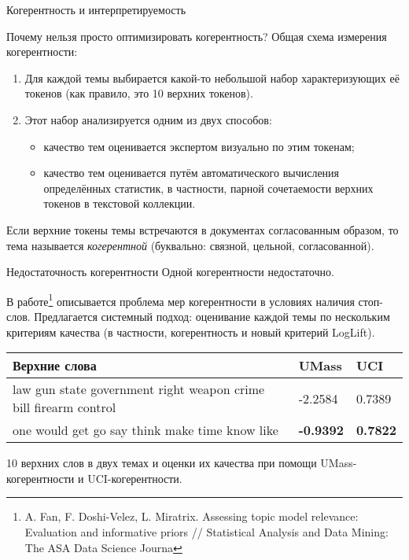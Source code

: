 


\begin{frame}{Когерентность и интерпретируемость}

Почему нельзя просто оптимизировать когерентность? Общая схема измерения когерентности:

\begin{enumerate}
    \item Для каждой темы выбирается какой-то небольшой набор характеризующих её токенов (как правило, это 10 верхних токенов).
    \item{Этот набор анализируется одним из двух способов:
    \begin{itemize}
        \item качество тем оценивается экспертом визуально по этим токенам;
        \item качество тем оценивается путём автоматического вычисления определённых статистик, в частности, парной сочетаемости верхних токенов в текстовой коллекции.
    \end{itemize}
    }
\end{enumerate}

Если верхние токены темы встречаются в документах согласованным образом,  то тема называется \textit{когерентной} (буквально: связной, цельной, согласованной).
\end{frame}

\begin{frame}{Недостаточность когерентности}
Одной когерентности недостаточно.

В работе\footnote{A. Fan, F. Doshi-Velez, L. Miratrix. Assessing topic model relevance: Evaluation and informative priors // Statistical Analysis and Data Mining: The ASA Data Science Journa} описывается проблема мер когерентности в условиях наличия стоп-слов. Предлагается системный подход: оценивание каждой темы по нескольким критериям качества (в частности, когерентность и новый критерий LogLift).

\smallskip
\begin{table}[ht]
    \small\centering
    \begin{tabularx}{0.8\textwidth}{|X|l|l|}
    \hline
    Верхние слова &  UMass & UCI
    \\ \hline	
law gun state government right weapon crime bill firearm control &
-2.2584 & 0.7389
    \\ \hline
one would get go say think make time know like & \textbf{-0.9392} & \textbf{0.7822}
    \\ \hline
    \end{tabularx}
\end{table}
10 верхних слов в двух темах и оценки их качества при помощи UMass-когерентности и UCI-когерентности.


\end{frame}



